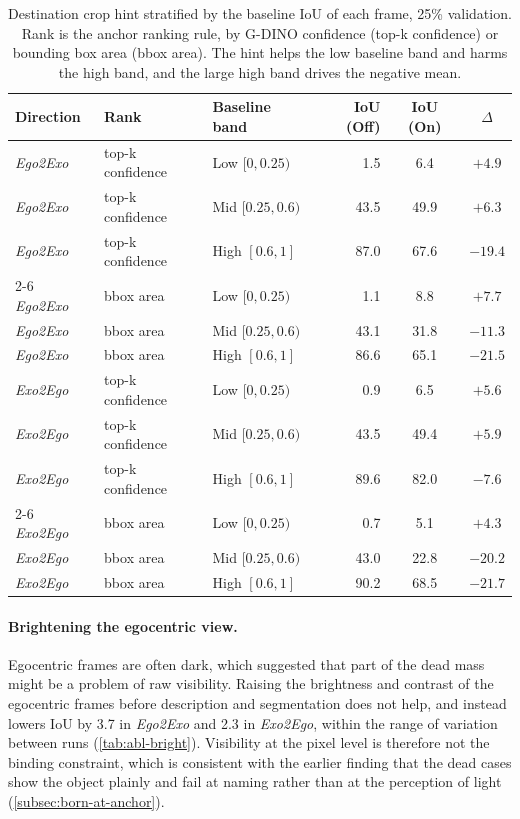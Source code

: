 \begin{table}
  \centering\small
  \setlength{\tabcolsep}{5pt}
  \caption{Destination crop hint stratified by the baseline IoU of each frame, 25\% validation. Rank is the anchor ranking rule, by G-DINO confidence (top-k confidence) or bounding box area (bbox area). The hint helps the low baseline band and harms the high band, and the large high band drives the negative mean.}
  \label{tab:abl-crop-strat}
  \begin{tabular}{lllrcc}
  \toprule
  Direction & Rank & Baseline band & IoU (Off) & IoU (On) & $\Delta$ \\
  \midrule
  \textit{Ego2Exo} & top-k confidence & Low $[0,0.25)$   &  1.5 & 6.4 & $+4.9$ \\
  \textit{Ego2Exo} & top-k confidence & Mid $[0.25,0.6)$ &  43.5 & 49.9 & $+6.3$ \\
  \textit{Ego2Exo} & top-k confidence & High $[0.6,1]$   & 87.0 & 67.6 & $-19.4$ \\
  \cmidrule(l){2-6}
  \textit{Ego2Exo} & bbox area & Low $[0,0.25)$   & 1.1 & 8.8 & $+7.7$ \\
  \textit{Ego2Exo} & bbox area & Mid $[0.25,0.6)$ &   43.1 & 31.8 & $-11.3$ \\
  \textit{Ego2Exo} & bbox area & High $[0.6,1]$   &  86.6 & 65.1 & $-21.5$ \\
  \midrule
  \textit{Exo2Ego} & top-k confidence & Low $[0,0.25)$   & 0.9 & 6.5 & $+5.6$ \\
  \textit{Exo2Ego} & top-k confidence & Mid $[0.25,0.6)$ &   43.5 & 49.4 & $+5.9$ \\
  \textit{Exo2Ego} & top-k confidence & High $[0.6,1]$   & 89.6 & 82.0 & $-7.6$ \\
  \cmidrule(l){2-6}
  \textit{Exo2Ego} & bbox area & Low $[0,0.25)$   &  0.7 & 5.1 & $+4.3$ \\
  \textit{Exo2Ego} & bbox area & Mid $[0.25,0.6)$ &   43.0 & 22.8 & $-20.2$ \\
  \textit{Exo2Ego} & bbox area & High $[0.6,1]$   &   90.2 & 68.5 & $-21.7$ \\
  \bottomrule
  \end{tabular}
\end{table}

\paragraph{Brightening the egocentric view.}
Egocentric frames are often dark, which suggested that part of the dead mass might be a problem of raw visibility. Raising the brightness and contrast of the egocentric frames before description and segmentation does not help, and instead lowers IoU by 3.7 in \textit{Ego2Exo} and 2.3 in \textit{Exo2Ego}, within the range of variation between runs (\cref{tab:abl-bright}). Visibility at the pixel level is therefore not the binding constraint, which is consistent with the earlier finding that the dead cases show the object plainly and fail at naming rather than at the perception of light (\cref{subsec:born-at-anchor}).

